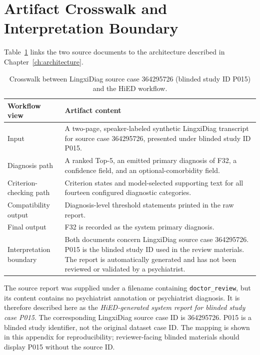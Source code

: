 \documentclass[12pt,a4paper,oneside]{report}
\begin{document}
\section{Artifact Crosswalk and Interpretation Boundary}

Table~\ref{tab:p015-artifact-crosswalk} links the two source documents to
the architecture described in Chapter~\ref{ch:architecture}.

\begin{table}[htbp]
\centering
\caption{Crosswalk between LingxiDiag source case 364295726 (blinded study ID P015) and the HiED workflow.}
\label{tab:p015-artifact-crosswalk}
\small
\renewcommand{\arraystretch}{1.12}
\begin{tabularx}{\textwidth}
{|>{\raggedright\arraybackslash}p{3.4cm}|
 >{\raggedright\arraybackslash}X|}
\hline
\textbf{Workflow view} & \textbf{Artifact content}\\
\hline
Input & A two-page, speaker-labeled synthetic LingxiDiag transcript for source case 364295726, presented under blinded study ID P015.\\
\hline
Diagnosis path & A ranked Top-5, an emitted primary diagnosis of F32, a confidence field, and an optional-comorbidity field.\\
\hline
Criterion-checking path & Criterion states and model-selected supporting text for all fourteen configured diagnostic categories.\\
\hline
Compatibility output & Diagnosis-level threshold statements printed in the raw report.\\
\hline
Final output & F32 is recorded as the system primary diagnosis.\\
\hline
Interpretation boundary & Both documents concern LingxiDiag source case 364295726. P015 is the blinded study ID used in the review materials. The report is automatically generated and has not been reviewed or validated by a psychiatrist.\\
\hline
\end{tabularx}
\renewcommand{\arraystretch}{1.0}
\end{table}

The source report was supplied under a filename containing
\texttt{doctor\_review}, but its content contains no psychiatrist annotation
or psychiatrist diagnosis. It is therefore described here as the
\emph{HiED-generated system report for blinded study case P015}. The
corresponding LingxiDiag source case ID is 364295726. P015 is a blinded
study identifier, not the original dataset case ID. The mapping is shown
in this appendix for reproducibility; reviewer-facing blinded materials
should display P015 without the source ID.
\end{document}
